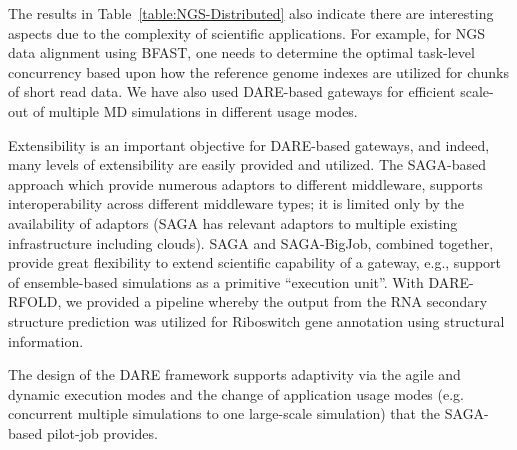 \documentclass[]{svjour3}
\begin{document}
The results in Table~\ref{table:NGS-Distributed} also indicate there
are interesting aspects due to the complexity of scientific
applications. For example, for NGS data alignment using BFAST, one
needs to determine the optimal task-level concurrency based upon how
the reference genome indexes are utilized for chunks of short read
data\cite{ecmls11}. We have also used DARE-based gateways for
efficient scale-out of multiple MD simulations in different usage
modes.



Extensibility is an important objective for DARE-based gateways, and
indeed, many levels of extensibility are easily provided and utilized.
The SAGA-based approach which provide numerous adaptors to different
middleware, supports interoperability across different middleware
types; it is limited only by the availability of adaptors (SAGA has
relevant adaptors to multiple existing infrastructure including
clouds). SAGA and SAGA-BigJob, combined together,
provide great flexibility to extend scientific capability of a
gateway, e.g., support of ensemble-based simulations as a primitive
``execution unit''. With DARE-RFOLD, we provided a pipeline whereby
the output from the RNA secondary structure prediction
was utilized for Riboswitch gene annotation using structural
information. %

The design of the DARE framework supports adaptivity via the agile and
dynamic execution modes and the change of application usage modes
(e.g. concurrent multiple simulations to one large-scale simulation)
that the SAGA-based pilot-job provides.


\end{document}
